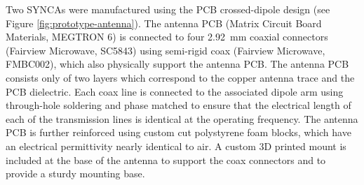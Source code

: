 Two SYNCAs were manufactured using the PCB crossed-dipole design (see Figure \ref{fig:prototype-antenna}). The antenna PCB (Matrix Circuit Board Materials, MEGTRON 6) is connected to four 2.92~mm coaxial connectors (Fairview Microwave, SC5843) using semi-rigid coax (Fairview Microwave, FMBC002), which also physically support the antenna PCB. The antenna PCB consists only of two layers which correspond to the copper antenna trace and the PCB dielectric. Each coax line is connected to the associated dipole arm using through-hole soldering and phase matched to ensure that the electrical length of each of the transmission lines is identical at the operating frequency. The antenna PCB is further reinforced using custom cut polystyrene foam blocks, which have an electrical permittivity nearly identical to air. A custom 3D printed mount is included at the base of the antenna to support the coax connectors and to provide a sturdy mounting base.

